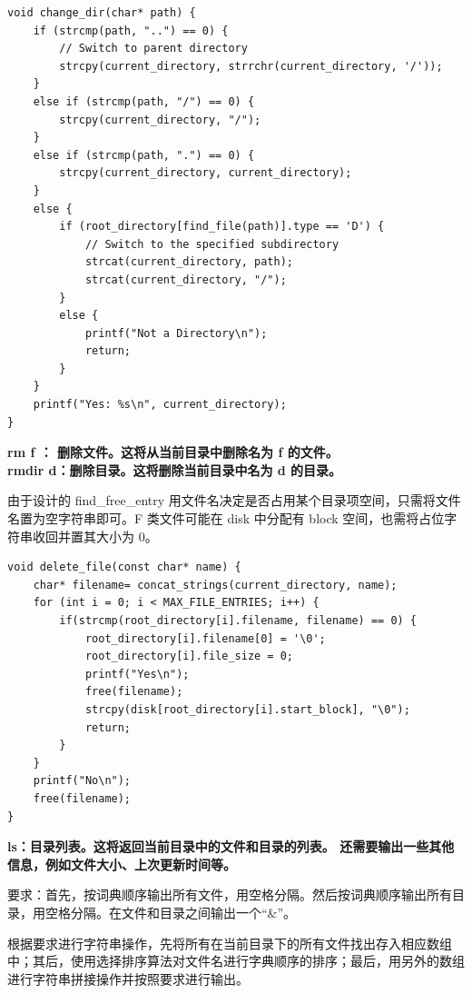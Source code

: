\documentclass{article}
\begin{document}
\begin{lstlisting}
void change_dir(char* path) {
    if (strcmp(path, "..") == 0) {
        // Switch to parent directory
        strcpy(current_directory, strrchr(current_directory, '/'));
    } 
    else if (strcmp(path, "/") == 0) {
        strcpy(current_directory, "/");
    }
    else if (strcmp(path, ".") == 0) {
        strcpy(current_directory, current_directory);
    }
    else {
        if (root_directory[find_file(path)].type == 'D') {
            // Switch to the specified subdirectory
            strcat(current_directory, path);
            strcat(current_directory, "/");
        }
        else {
            printf("Not a Directory\n");
            return;
        }
    }
    printf("Yes: %s\n", current_directory);
}
\end{lstlisting}

\noindent\textbf{rm f ： 删除文件。这将从当前目录中删除名为 f 的文件。\\
rmdir d：删除目录。这将删除当前目录中名为 d 的目录。}

由于设计的 find\_free\_entry 用文件名决定是否占用某个目录项空间，只需将文件名置为空字符串即可。F 类文件可能在 disk 中分配有 block 空间，也需将占位字符串收回并置其大小为 0。

\begin{lstlisting}
void delete_file(const char* name) {
    char* filename= concat_strings(current_directory, name);
    for (int i = 0; i < MAX_FILE_ENTRIES; i++) {
        if(strcmp(root_directory[i].filename, filename) == 0) {
            root_directory[i].filename[0] = '\0';
            root_directory[i].file_size = 0;
            printf("Yes\n");
            free(filename);
            strcpy(disk[root_directory[i].start_block], "\0");
            return;
        }
    }
    printf("No\n");
    free(filename);
}
\end{lstlisting}

\noindent\textbf{ls：目录列表。这将返回当前目录中的文件和目录的列表。 还需要输出一些其他信息，例如文件大小、上次更新时间等。}

要求：首先，按词典顺序输出所有文件，用空格分隔。然后按词典顺序输出所有目录，用空格分隔。在文件和目录之间输出一个“&”。

根据要求进行字符串操作，先将所有在当前目录下的所有文件找出存入相应数组中；其后，使用选择排序算法对文件名进行字典顺序的排序；最后，用另外的数组进行字符串拼接操作并按照要求进行输出。
\end{document}
